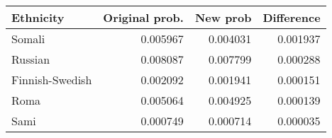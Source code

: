 \begin{tabular}{lrrr}
\toprule
      Ethnicity &  Original prob. &  New prob &  Difference \\
\midrule
         Somali &        0.005967 &  0.004031 &    0.001937 \\
        Russian &        0.008087 &  0.007799 &    0.000288 \\
Finnish-Swedish &        0.002092 &  0.001941 &    0.000151 \\
           Roma &        0.005064 &  0.004925 &    0.000139 \\
           Sami &        0.000749 &  0.000714 &    0.000035 \\
\bottomrule
\end{tabular}
